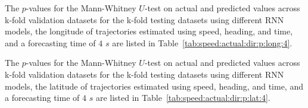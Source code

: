 The $p$-values for the Mann-Whitney $U$-test on actual and predicted values across k-fold validation datasets for the k-fold testing datasets using different RNN models, the longitude of trajectories estimated using speed, heading, and time, and a forecasting time of $4$ $s$ are listed in Table~\ref{tab:speed:actual:dir:p:long:4}.

\begin{table}[!ht]
	\centering
	\caption{The $p$-values for the Mann-Whitney $U$-test on actual and predicted values across k-fold validation datasets for the k-fold testing datasets using different RNN models, the longitude of trajectories estimated using speed, heading, and time, and a forecasting time of $4$ $s$.}
	\label{tab:speed:actual:dir:p:long:4}
\end{table}

The $p$-values for the Mann-Whitney $U$-test on actual and predicted values across k-fold validation datasets for the k-fold testing datasets using different RNN models, the latitude of trajectories estimated using speed, heading, and time, and a forecasting time of $4$ $s$ are listed in Table~\ref{tab:speed:actual:dir:p:lat:4}.

